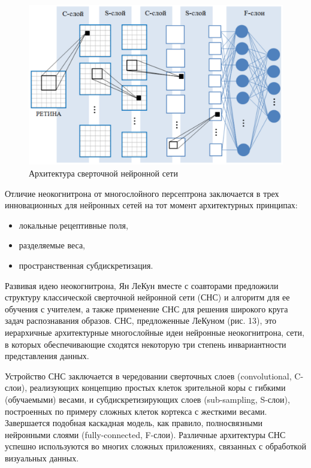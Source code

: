 \begin{figure}[h!]
\centering
\includegraphics[scale=0.35]{res/pic013}
\caption{Архитектура сверточной нейронной сети}
\end{figure}

Отличие неокогнитрона от многослойного персептрона заключается в трех инновационных для нейронных сетей на тот момент архитектурных принципах:
\begin{itemize}
\item локальные рецептивные поля,
\item разделяемые веса,
\item пространственная субдискретизация.
\end{itemize}

Развивая идею неокогнитрона, Ян ЛеКун вместе с соавторами предложили структуру классической сверточной нейронной сети (СНС) и алгоритм для ее обучения с учителем, а также применение СНС для решения широкого круга задач распознавания образов. СНС, предложенные ЛеКуном (рис. 13), это иерархичные архитектурные многослойные идеи нейронные неокогнитрона, сети, в которых обеспечивающие сходятся некоторую три степень инвариантности представления данных.

Устройство СНС заключается в чередовании сверточных слоев (convolutional, C-слои), реализующих концепцию простых клеток зрительной коры с гибкими (обучаемыми) весами, и субдискретизирующих слоев (sub-sampling, S-слои), построенных по примеру сложных клеток кортекса с жесткими весами. Завершается подобная каскадная модель, как правило, полносвязными нейронными слоями (fully-connected, F-слои). Различные архитектуры СНС успешно используются во многих сложных приложениях, связанных с обработкой визуальных данных.
